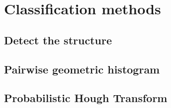 \chapter{Classification methods }
\section{Detect the structure}
\section{Pairwise geometric histogram}
\section{Probabilistic Hough Transform}